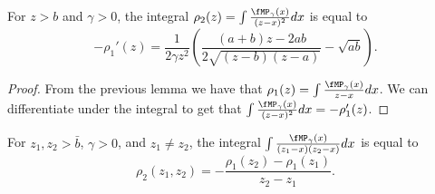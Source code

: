 \begin{lemma}
    For $z > b$ and $\gamma > 0$, the integral
    $\rho_2(z) = \int \frac{\fMP_\gamma(x)}{(z - x)^2} dx$ is equal to
    \[
        -\rho_{1}'(z)
        =
        \frac{1}{2 \gamma z^2}
        \left(
            \frac{(a + b) z - 2 a b}
                 {2 \sqrt{(z - b)(z - a)}}
            -
            \sqrt{a b}
        \right).
    \]
\end{lemma}
\begin{proof}
    From the previous lemma we have that
    $\rho_{1}(z) = \int \frac{\fMP_\gamma(x)}{z - x} dx$.
    We can differentiate under the integral to get that
    $\int \frac{\fMP_\gamma(x)}{(z - x)^2} dx = - \rho_{1}'(z)$.    
\end{proof}

\begin{lemma}
For $z_1, z_2 > \bar b$, $\gamma > 0$, and $z_1 \neq z_2$, the integral
    $\int \frac{\fMP_\gamma(x)}{(z_1 - x)(z_2 - x)} dx$ is equal to
    \[
        \rho_2(z_1, z_2)
        =
        -
        \frac{\rho_1(z_2) - \rho_1(z_1)}{z_2 - z_1}.
    \]
\end{lemma}
